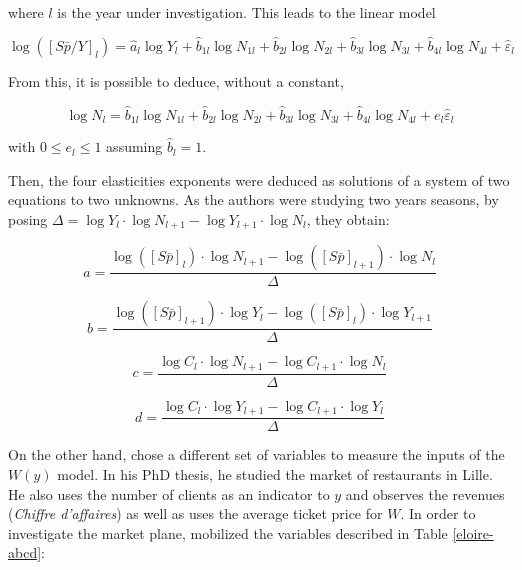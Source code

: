 \documentclass[a4paper, 12pt, openright, oneside, german, french, brazil, english]{abntex2}
\begin{document}
	where $l$ is the year under investigation. This leads to the linear model
	
	\begin{equation}
	\label{regression}
		\log([S\bar{p}/Y]_l) = \hat{a}_l \log Y_l + \hat{b}_{1l} \log N_{1l} + \hat{b}_{2l} \log N_{2l} + \hat{b}_{3l} \log N_{3l} + \hat{b}_{4l} \log N_{4l} + \hat{\varepsilon}_l
	\end{equation}
	
	From this, it is possible to deduce, without a constant,
	
	\begin{equation}
	\label{N-com-pesos}
		\log N_l = \hat{b}_{1l} \log N_{1l} + \hat{b}_{2l} \log N_{2l} + \hat{b}_{3l} \log N_{3l} + \hat{b}_{4l} \log N_{4l} + e_l \hat{\varepsilon}_l
	\end{equation}
	
	with $0 \le e_l \le 1$ assuming $\hat{b}_l = 1$.
	
	Then, the four elasticities exponents were deduced as solutions of a system of two equations to two unknowns. As the authors were studying two years seasons, by posing $\Delta = \log Y_l \cdot \log N_{l+1} - \log Y_{l+1} \cdot \log N_l$, they obtain:
	
	$$ a = \frac{ \log([S\bar{p}]_l) \cdot \log N_{l+1} - \log([S\bar{p}]_{l+1}) \cdot \log N_{l} }{\Delta} $$
	
	$$ b = \frac{ \log([S\bar{p}]_{l+1}) \cdot \log Y_{l} - \log([S\bar{p}]_{l}) \cdot \log Y_{l+1} }{\Delta} $$
	
	$$ c = \frac{ \log C_l \cdot \log N_{l+1} - \log C_{l+1} \cdot \log N_{l} }{\Delta} $$
	
	\begin{equation}
	\label{parameters}
		d = \frac{ \log C_l \cdot \log Y_{l+1} - \log C_{l+1} \cdot \log Y_{l} }{\Delta}
	\end{equation}
	




	On the other hand,  chose a different set of variables to measure the inputs of the $W(y)$ model. In his PhD thesis, he studied the market of restaurants in Lille. He also uses the number of clients as an indicator to $y$ and observes the revenues (\textit{Chiffre d'affaires}) as well as uses the average ticket price for $W$. In order to investigate the market plane,  mobilized the variables described in Table \ref{eloire-abcd}:
\end{document}
